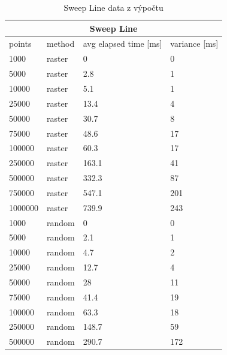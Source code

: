 \documentclass[12pt]{article}
\begin{document}
\begin{table}[h!]
\centering
\caption{Sweep Line data z výpočtu}
\begin{tabular}{|l|l|l|l|}
\hline
\multicolumn{4}{|c|}{\textbf{Sweep Line}}                        \\ \hline
points  & method & avg elapsed time {[}ms{]} & variance {[}ms{]} \\ \hline
1000    & raster & 0                         & 0                 \\ \hline
5000    & raster & 2.8                       & 1                 \\ \hline
10000   & raster & 5.1                       & 1                 \\ \hline
25000   & raster & 13.4                      & 4                 \\ \hline
50000   & raster & 30.7                      & 8                 \\ \hline
75000   & raster & 48.6                      & 17                \\ \hline
100000  & raster & 60.3                      & 17                \\ \hline
250000  & raster & 163.1                     & 41                \\ \hline
500000  & raster & 332.3                     & 87                \\ \hline
750000  & raster & 547.1                     & 201               \\ \hline
1000000 & raster & 739.9                     & 243               \\ \hline
1000    & random & 0                         & 0                 \\ \hline
5000    & random & 2.1                       & 1                 \\ \hline
10000   & random & 4.7                       & 2                 \\ \hline
25000   & random & 12.7                      & 4                 \\ \hline
50000   & random & 28                        & 11                \\ \hline
75000   & random & 41.4                      & 19                \\ \hline
100000  & random & 63.3                      & 18                \\ \hline
250000  & random & 148.7                     & 59                \\ \hline
500000  & random & 290.7                     & 172               \\ \hline

\end{tabular}
\end{table}
\end{document}

